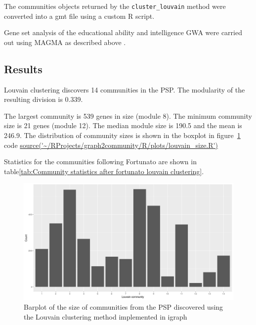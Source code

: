 The communities objects returned by the \texttt{cluster\_louvain} method were converted into a gmt file using a custom R script.

Gene set analysis of the educational ability and intelligence GWA were carried out using MAGMA as described above . 



\subsection{Results}
Louvain clustering discovers 14 communities in the PSP. The modularity of the resulting division is 0.339. 

The largest community is 539 genes in size (module 8). The minimum community size is 21 genes (module 12). The median module size is 190.5 and the mean is 246.9. The distribution of community sizes is shown in the boxplot in figure~\ref{fig:barplot_size_commmunities_using_louvain} code \url{source('~/RProjects/graph2community/R/plots/louvain_size.R')}

Statistics for the communities following Fortunato \cite{fortunato2016community} are shown in table\ref{tab:Community statistics after fortunato louvain clustering}.

\begin{figure}
    \centering
    \includegraphics[width=\textwidth]{images/Rplot_Louvain_community_sizes.png}
    \caption{Barplot of the size of communities from the PSP discovered using the Louvain clustering method implemented in igraph}
    \label{fig:barplot_size_commmunities_using_louvain}
\end{figure}






